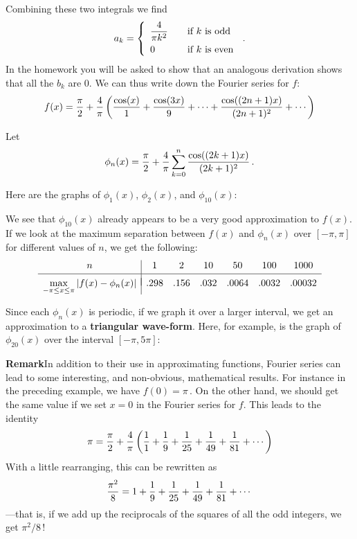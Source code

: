 {{{{   Combining these two integrals we find
   \[
a_k=\left\{ \begin{array}{ll}
				{\displaystyle {4 \over \pi k^2}} & \quad\mbox{if $k$ is odd} \\ [.1in]
				0  & \quad\mbox{if $k$ is even}
		\end{array}
	\right. \,.
\]
In the homework you will be asked to show that an analogous derivation shows that all the $b_k$ are 0. We can thus write down the Fourier series for $f$:
\[
f(x)={\pi \over 2} +{4 \over \pi}\left({\cos(x) \over 1} + {\cos(3x) \over 9} + \cdots +{\cos((2n+1)x) \over (2n+1)^2} + \cdots \right)
\]

Let
\[
\phi_n(x)={\pi \over 2} +{4 \over \pi}\sum_{k=0}^n {\cos((2k+1)x) \over (2k+1)^2}\,.
\]

\smallskip
\noindent
Here are the graphs of $\phi_1(x)$, $\phi_2(x)$, and $\phi_{10}(x)$:

\vspace*{1.5in}

We see that $\phi_{10}(x)$ already appears to be a very good approximation to $f(x)$.  If we look at the maximum separation between $f(x)$ and $\phi_n(x)$ over $[-\pi, \pi]$ for different values of $n$, we get the following:
\[
\begin{array}{c|cccccc}
	n  & 1&2&10&50&100&1000 \\ [2pt] \hline
	&&&&&& \\ [-8pt]
	{\displaystyle \max_{-\pi\le x\le \pi}|f(x)-\phi_n(x)|}&.298&.156&.032&.0064&.0032&.00032
	\end{array}
\]

Since each $\phi_n(x)$ is periodic, if we graph it over a larger interval, we get an approximation to a {\bf triangular wave-form}.  Here, for example, 
\newpage
\noindent
is the graph of $\phi_{20}(x)$ over the interval $[-\pi, 5\pi]$:

\vspace*{1.5in}




{\bf Remark}\quad In addition to their use in approximating functions, Fourier series can lead to some interesting, and non-obvious, mathematical results.  For instance in the preceding example, we have $f(0)=\pi$\,. On the other hand, we should get the same value if we set $x=0$ in the Fourier series for $f$.  This leads to the identity
\[
\pi ={\pi \over 2} +{4 \over \pi}\left({1 \over 1} + {1 \over 9} +{1 \over 25}+{1 \over 49} +{1 \over 81} + \cdots \right)
\]
With a little rearranging, this can be rewritten as
\[
{\pi^2 \over 8} = 1 + {1 \over 9} +{1 \over 25}+{1 \over 49} +{1 \over 81} + \cdots
\]
---that is, if we add up the reciprocals of the squares of all the odd integers, we get $\pi^2/8$\,!

}}}}
